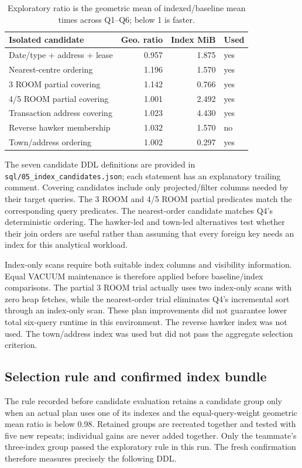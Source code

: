 \documentclass[11pt,a4paper]{article}
\begin{document}
\begin{table}[H]\centering\small
\begin{tabular}{lrrl}
\toprule
Isolated candidate & Geo. ratio & Index MiB & Used \\
\midrule
Date/type + address + lease & 0.957 & 1.875 & yes \\
Nearest-centre ordering & 1.196 & 1.570 & yes \\
3 ROOM partial covering & 1.142 & 0.766 & yes \\
4/5 ROOM partial covering & 1.001 & 2.492 & yes \\
Transaction address covering & 1.023 & 4.430 & yes \\
Reverse hawker membership & 1.032 & 1.570 & no \\
Town/address ordering & 1.002 & 0.297 & yes \\
\bottomrule
\end{tabular}
\caption{Exploratory ratio is the geometric mean of indexed/baseline mean times across Q1--Q6; below 1 is faster.}
\end{table}

The seven candidate DDL definitions are provided in \texttt{sql/05\_index\_candidates.json}; each statement has an explanatory trailing comment. Covering candidates include only projected/filter columns needed by their target queries. The 3 ROOM and 4/5 ROOM partial predicates match the corresponding query predicates. The nearest-order candidate matches Q4's deterministic ordering. The hawker-led and town-led alternatives test whether their join orders are useful rather than assuming that every foreign key needs an index for this analytical workload.

Index-only scans require both suitable index columns and visibility information. Equal VACUUM maintenance is therefore applied before baseline/index comparisons. The partial 3 ROOM trial actually uses two index-only scans with zero heap fetches, while the nearest-order trial eliminates Q4's incremental sort through an index-only scan. These plan improvements did not guarantee lower total six-query runtime in this environment. The reverse hawker index was not used. The town/address index was used but did not pass the aggregate selection criterion.

\subsection{Selection rule and confirmed index bundle}
The rule recorded before candidate evaluation retains a candidate group only when an actual plan uses one of its indexes and the equal-query-weight geometric mean ratio is below 0.98. Retained groups are recreated together and tested with five new repeats; individual gains are never added together. Only the teammate's three-index group passed the exploratory rule in this run. The fresh confirmation therefore measures precisely the following DDL.

\end{document}
